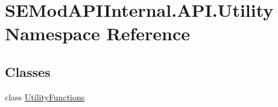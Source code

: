 \hypertarget{namespace_s_e_mod_a_p_i_internal_1_1_a_p_i_1_1_utility}{}\section{S\+E\+Mod\+A\+P\+I\+Internal.\+A\+P\+I.\+Utility Namespace Reference}
\label{namespace_s_e_mod_a_p_i_internal_1_1_a_p_i_1_1_utility}
\subsection*{Classes}
\begin{DoxyCompactItemize}
\item 
class \hyperlink{class_s_e_mod_a_p_i_internal_1_1_a_p_i_1_1_utility_1_1_utility_functions}{Utility\+Functions}
\end{DoxyCompactItemize}
